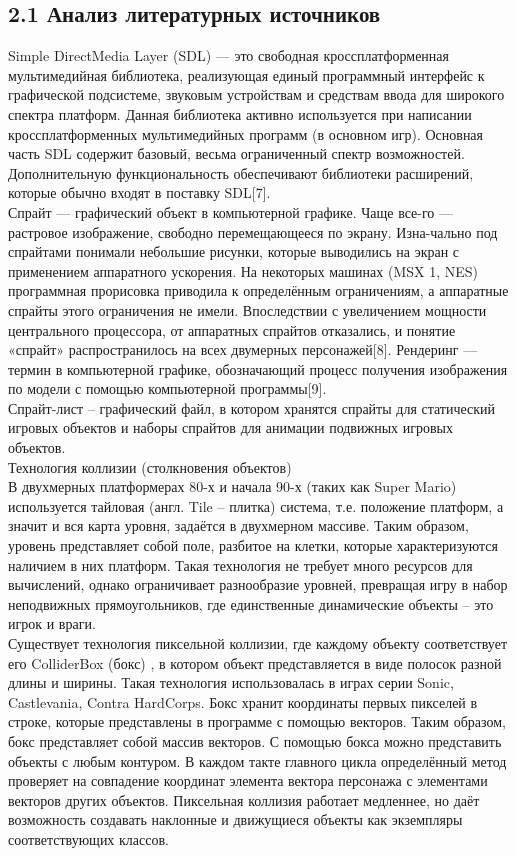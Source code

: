 \documentclass[14pt,a4paper]{extreport}
\begin{document}
	\subsection*{\normalsize\hspace{4ex}2.1 Анализ литературных источников}
	\hspace{4ex}Simple DirectMedia Layer (SDL) — это свободная кроссплатформенная мультимедийная библиотека, реализующая единый программный интерфейс к графической подсистеме, звуковым устройствам и средствам ввода для широкого спектра платформ. Данная библиотека активно используется при написании кроссплатформенных мультимедийных программ (в основном игр). Основная часть SDL содержит базовый, весьма ограниченный спектр возможностей. Дополнительную функциональность обеспечивают библиотеки расширений, которые обычно входят в поставку SDL[7].
\\Спрайт — графический объект в компьютерной графике. Чаще все-го — растровое изображение, свободно перемещающееся по экрану. Изна-чально под спрайтами понимали небольшие рисунки, которые выводились на экран с применением аппаратного ускорения. На некоторых машинах (MSX 1, NES) программная прорисовка приводила к определённым ограничениям, а аппаратные спрайты этого ограничения не имели. Впоследствии с увеличением мощности центрального процессора, от аппаратных спрайтов отказались, и понятие «спрайт» распространилось на всех двумерных персонажей[8]. 
Рендеринг — термин в компьютерной графике, обозначающий процесс получения изображения по модели с помощью компьютерной программы[9].
\\Спрайт-лист – графический файл, в котором хранятся спрайты для статический игровых объектов и наборы спрайтов для анимации подвижных игровых объектов.
\\Технология коллизии (столкновения объектов)
\\В двухмерных платформерах 80-х и начала 90-х  (таких как Super Mario) используется тайловая (англ. Tile – плитка) система, т.е. положение платформ, а значит и вся карта уровня, задаётся в двухмерном массиве. Таким образом, уровень представляет собой поле, разбитое на клетки, которые характеризуются наличием в них платформ. Такая технология не требует много ресурсов для вычислений, однако ограничивает разнообразие уровней, превращая игру в набор неподвижных прямоугольников, где единственные динамические объекты – это игрок и враги.
\\Существует технология пиксельной коллизии, где каждому объекту соответствует его ColliderBox (бокс) , в котором объект представляется в виде полосок разной длины и ширины. Такая технология использовалась в играх серии Sonic, Castlevania, Contra HardCorps.  Бокс хранит координаты первых пикселей в строке, которые представлены в программе с помощью векторов. Таким образом, бокс представляет собой массив векторов.  С помощью бокса можно представить объекты с любым контуром. В каждом такте главного цикла определённый метод проверяет на совпадение координат элемента вектора персонажа с элементами векторов других объектов. Пиксельная коллизия работает медленнее, но даёт возможность создавать наклонные и движущиеся объекты как экземпляры соответствующих классов.
\end{document}
